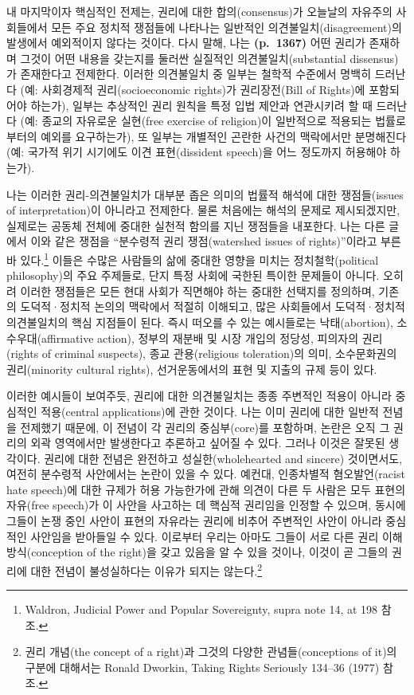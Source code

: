 \documentclass[a4paper,12pt,oneside]{article}  %
\begin{document}
내 마지막이자 핵심적인 전제는, 권리에 대한 합의(consensus)가 오늘날의
자유주의 사회들에서 모든 주요 정치적 쟁점들에 나타나는 일반적인
의견불일치(disagreement)의 발생에서 예외적이지 않다는 것이다. 다시 말해,
나는 \textbf{(p.~1367)} 어떤 권리가 존재하며 그것이 어떤 내용을 갖는지를
둘러싼 실질적인 의견불일치(substantial dissensus)가 존재한다고 전제한다.
이러한 의견불일치 중 일부는 철학적 수준에서 명백히 드러난다 (예:
사회경제적 권리(socioeconomic rights)가 권리장전(Bill of Rights)에
포함되어야 하는가), 일부는 추상적인 권리 원칙을 특정 입법 제안과
연관시키려 할 때 드러난다 (예: 종교의 자유로운 실현(free exercise of
religion)이 일반적으로 적용되는 법률로부터의 예외를 요구하는가), 또
일부는 개별적인 곤란한 사건의 맥락에서만 분명해진다 (예: 국가적 위기
시기에도 이견 표현(dissident speech)을 어느 정도까지 허용해야 하는가).

나는 이러한 권리-의견불일치가 대부분 좁은 의미의 법률적 해석에 대한
쟁점들(issues of interpretation)이 아니라고 전제한다. 물론 처음에는
해석의 문제로 제시되겠지만, 실제로는 공동체 전체에 중대한 실천적 함의를
지닌 쟁점들을 내포한다. 나는 다른 글에서 이와 같은 쟁점을 ``분수령적
권리 쟁점(watershed issues of rights)''이라고 부른 바 있다.\footnote{Waldron,
  Judicial Power and Popular Sovereignty, supra note 14, at 198 참조.}
이들은 수많은 사람들의 삶에 중대한 영향을 미치는 정치철학(political
philosophy)의 주요 주제들로, 단지 특정 사회에 국한된 특이한 문제들이
아니다. 오히려 이러한 쟁점들은 모든 현대 사회가 직면해야 하는 중대한
선택지를 정의하며, 기존의 도덕적·정치적 논의의 맥락에서 적절히 이해되고,
많은 사회들에서 도덕적·정치적 의견불일치의 핵심 지점들이 된다. 즉시
떠오를 수 있는 예시들로는 낙태(abortion), 소수우대(affirmative action),
정부의 재분배 및 시장 개입의 정당성, 피의자의 권리(rights of criminal
suspects), 종교 관용(religious toleration)의 의미, 소수문화권의
권리(minority cultural rights), 선거운동에서의 표현 및 지출의 규제 등이
있다.

이러한 예시들이 보여주듯, 권리에 대한 의견불일치는 종종 주변적인 적용이
아니라 중심적인 적용(central applications)에 관한 것이다. 나는 이미
권리에 대한 일반적 전념을 전제했기 때문에, 이 전념이 각 권리의
중심부(core)를 포함하며, 논란은 오직 그 권리의 외곽 영역에서만
발생한다고 추론하고 싶어질 수 있다. 그러나 이것은 잘못된 생각이다.
권리에 대한 전념은 완전하고 성실한(wholehearted and sincere) 것이면서도,
여전히 분수령적 사안에서는 논란이 있을 수 있다. 예컨대, 인종차별적
혐오발언(racist hate speech)에 대한 규제가 허용 가능한가에 관해 의견이
다른 두 사람은 모두 표현의 자유(free speech)가 이 사안을 사고하는 데
핵심적 권리임을 인정할 수 있으며, 동시에 그들이 논쟁 중인 사안이 표현의
자유라는 권리에 비추어 주변적인 사안이 아니라 중심적인 사안임을 받아들일
수 있다. 이로부터 우리는 아마도 그들이 서로 다른 권리
이해방식(conception of the right)을 갖고 있음을 알 수 있을 것이나,
이것이 곧 그들의 권리에 대한 전념이 불성실하다는 이유가 되지는
않는다.\footnote{권리 개념(the concept of a right)과 그것의 다양한
  관념들(conceptions of it)의 구분에 대해서는 Ronald Dworkin, Taking
  Rights Seriously 134--36 (1977) 참조.}
\end{document}
